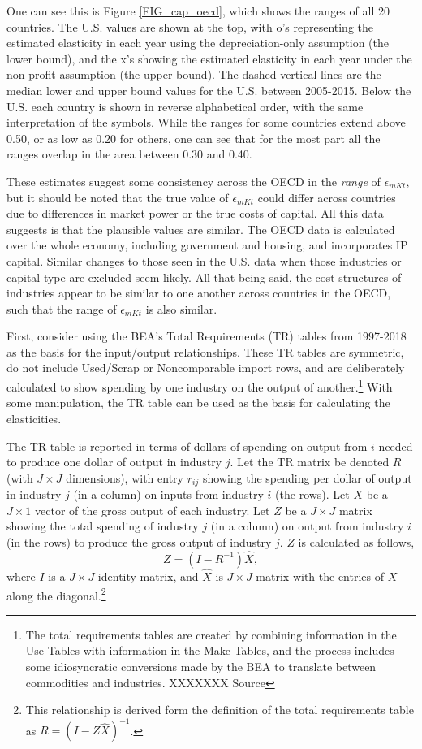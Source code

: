 One can see this is Figure \ref{FIG_cap_oecd}, which shows the ranges of all 20 countries. The U.S. values are shown at the top, with o's representing the estimated elasticity in each year using the depreciation-only assumption (the lower bound), and the x's showing the estimated elasticity in each year under the non-profit assumption (the upper bound). The dashed vertical lines are the median lower and upper bound values for the U.S. between 2005-2015. Below the U.S. each country is shown in reverse alphabetical order, with the same interpretation of the symbols. While the ranges for some countries extend above 0.50, or as low as 0.20 for others, one can see that for the most part all the ranges overlap in the area between 0.30 and 0.40. 

These estimates suggest some consistency across the OECD in the \textit{range} of $\epsilon_{mKt}$, but it should be noted that the true value of $\epsilon_{mKt}$ could differ across countries due to differences in market power or the true costs of capital. All this data suggests is that the plausible values are similar. The OECD data is calculated over the whole economy, including government and housing, and incorporates IP capital. Similar changes to those seen in the U.S. data when those industries or capital type are excluded seem likely. All that being said, the cost structures of industries appear to be similar to one another across countries in the OECD, such that the range of $\epsilon_{mKt}$ is also similar.



First, consider using the BEA's Total Requirements (TR) tables from 1997-2018 as the basis for the input/output relationships. These TR tables are symmetric, do not include Used/Scrap or Noncomparable import rows, and are deliberately calculated to show spending by one industry on the output of another.\footnote{The total requirements tables are created by combining information in the Use Tables with information in the Make Tables, and the process includes some idiosyncratic conversions made by the BEA to translate between commodities and industries. XXXXXXX Source} With some manipulation, the TR table can be used as the basis for calculating the elasticities. 

The TR table is reported in terms of dollars of spending on output from $i$ needed to produce one dollar of output in industry $j$. Let the TR matrix be denoted $R$ (with $J\times J$ dimensions), with entry $r_{ij}$ showing the spending per dollar of output in industry $j$ (in a column) on inputs from industry $i$ (the rows). Let $X$ be a $J\times 1$ vector of the gross output of each industry. Let $Z$ be a $J\times J$ matrix showing the total spending of industry $j$ (in a column) on output from industry $i$ (in the rows) to produce the gross output of industry $j$. $Z$ is calculated as follows,
\begin{equation}
	Z = (I - R^{-1})\hat{X},
\end{equation}
where $I$ is a $J\times J$ identity matrix, and $\hat{X}$ is $J\times J$ matrix with the entries of $X$ along the diagonal.\footnote{This relationship is derived form the definition of the total requirements table as $R = (I - Z \hat{X})^{-1}$.} 


